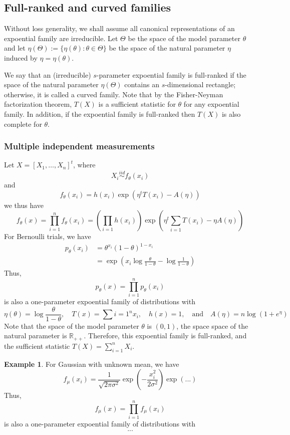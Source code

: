 \documentclass[11pt, oneside]{book}
\theoremstyle{definition}
\newtheorem{exmp}{Example}[section]
\begin{document}
\subsection{Full-ranked and curved families}
Without loss generality, we shall assume all canonical representations of an expoential family are irreducible. Let $\Theta$ be the space of the model parameter $\theta$ and let $\eta(\Theta) := \{\eta(\theta) : \theta \in \Theta\}$ be the space of the natural parameter $\eta$ induced by $\eta = \eta(\theta)$. 

We say that an (irreducible) $s$-parameter expoential family is full-ranked if the space of the natural parameter $\eta(\Theta)$ contains an $s$-dimensional rectangle; otherwise, it is called a curved family. Note that by the Fisher-Neyman factorization theorem, $T(X)$ is a sufficient statistic for $\theta$ for any expoential family. In addition, if the expoential family is full-ranked then $T(X)$ is also complete for $\theta$.

\subsubsection{Multiple independent measurements}
Let $X = [X_1, \dots, X_n]^t$, where
\[
  X_i \overset{iid}{\sim} f_\theta(x_i)
\]
and
\[
  f_\theta(x_i) = h(x_i) \exp (\eta^t T(x_i) - A(\eta))
\]
we thus have
\[
  f_\theta(x) = \prod_{i=1}^{n} f_\theta(x_i) = \left(\prod_{i=1} h(x_i) \right) \exp \left( \eta^t \sum_{i=1} T(x_i) - \eta A(\eta) \right)
\]
For Bernoulli trials, we have 
\begin{align*}
  p_\theta (x_i) &= \theta^{x_i} (1-\theta)^{1-x_i} \\
                 &= \exp \left(x_i \log \frac{\theta}{1-\theta} - \log \frac{1}{1 - \theta}\right)
\end{align*}
Thus, 
\[
  p_\theta(x) = \prod_{i=1}^{n} p_\theta(x_i)
\]
is also a one-parameter expoential family of distributions with
\[
  \eta(\theta) = \log \frac{\theta}{1 - \theta}, \quad T(x) = \sum{i=1}^{n} x_i, \quad h(x) = 1, \quad \text{and} \quad A(\eta) = n \log (1 + e^\eta)
\]
Note that the space of the model parameter $\theta$ is $(0, 1)$, the space space of the natural parameter is $\mathbb{R}_{++}$. Therefore, this expoential family is full-ranked, and the sufficient statistic $T(X) = \sum_{i=1}^n X_i$. \\

\begin{exmp}
  For Gaussian with unknown mean, we have 
  \[
    f_\mu(x_i) = \frac{1}{\sqrt{2\pi \sigma^2}} \exp \left( - \frac{x_i^2}{2\sigma^2} \right) \exp \left(...\right)
  \]
  Thus,
  \[
    f_\mu(x) = \prod_{i=1}^n f_\mu(x_i) 
  \]
  is also a one-parameter expoential family of distributions with
  \begin{align*}
    ...
  \end{align*}
  
\end{exmp}
\end{document}
